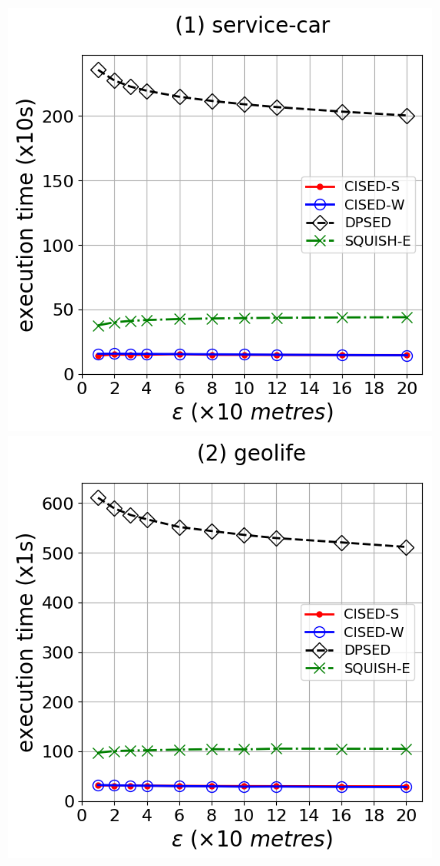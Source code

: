 \begin{figure}[tb!]
\centering
\includegraphics[scale = 0.30]{Figures/Exp-time-epsilon-service.png}
\includegraphics[scale = 0.30]{Figures/Exp-time-epsilon-geolife.png}

\end{figure}

